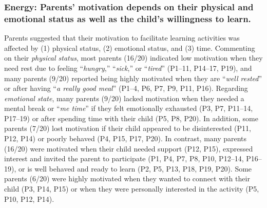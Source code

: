 \subsubsection{\textbf{Energy:} Parents' motivation depends on their physical and emotional status as well as the child's willingness to learn.}
Parents suggested that their motivation to facilitate learning activities was affected by (1) physical status, (2) emotional status, and (3) time. Commenting on their \textit{physical status}, most parents (16/20) indicated low motivation when they need rest due to feeling ``\textit{hungry},'' ``\textit{sick},'' or ``\textit{tired}'' (P1--11, P14--17, P19), and many parents (9/20) reported being highly motivated when they are ``\textit{well rested}'' or after having ``\textit{a really good meal}'' (P1--4, P6, P7, P9, P11, P16). Regarding \textit{emotional state}, many parents (9/20) lacked motivation when they needed a mental break or ``\textit{me time}'' if they felt emotionally exhausted (P3, P7, P11--14, P17--19) or after spending time with their child (P5, P8, P20). In addition, some parents (7/20) lost motivation if their child appeared to be disinterested (P11, P12, P14) or poorly behaved (P4, P15, P17, P20). In contrast, many parents (16/20) were motivated when their child needed support (P12, P15), expressed interest and invited the parent to participate (P1, P4, P7, P8, P10, P12–14, P16–19), or is well behaved and ready to learn (P2, P5, P13, P18, P19, P20). Some parents (6/20) were highly motivated when they wanted to connect with their child (P3, P14, P15) or when they were personally interested in the activity (P5, P10, P12, P14).


